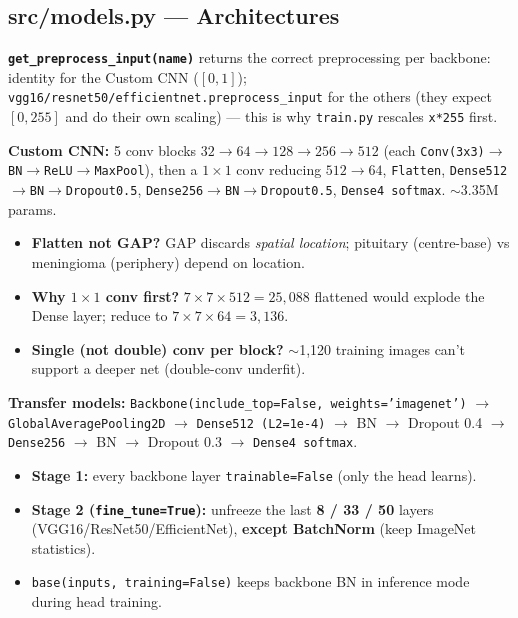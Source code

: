 \documentclass[11pt,a4paper]{article}
\newcommand{\code}[1]{\colorbox{codebg}{\small\texttt{#1}}}
\begin{document}
\subsection{src/models.py --- Architectures}
\textbf{\code{get\_preprocess\_input(name)}} returns the correct preprocessing per backbone: identity for the Custom
CNN ($[0,1]$); \code{vgg16/resnet50/efficientnet.preprocess\_input} for the others (they expect $[0,255]$ and do
their own scaling) --- this is why \code{train.py} rescales \code{x*255} first.

\begin{keybox}
\textbf{Custom CNN:} 5 conv blocks $32\to64\to128\to256\to512$ (each \code{Conv(3x3)$\to$BN$\to$ReLU$\to$MaxPool}),
then a $1\times1$ conv reducing $512\to64$, \code{Flatten}, \code{Dense512$\to$BN$\to$Dropout0.5},
\code{Dense256$\to$BN$\to$Dropout0.5}, \code{Dense4 softmax}. $\sim$3.35M params.
\begin{itemize}[leftmargin=*,itemsep=1pt]
  \item \textbf{Flatten not GAP?} GAP discards \emph{spatial location}; pituitary (centre-base) vs meningioma (periphery) depend on location.
  \item \textbf{Why $1\times1$ conv first?} $7{\times}7{\times}512=25{,}088$ flattened would explode the Dense layer; reduce to $7{\times}7{\times}64=3{,}136$.
  \item \textbf{Single (not double) conv per block?} $\sim$1{,}120 training images can't support a deeper net (double-conv underfit).
\end{itemize}
\end{keybox}

\noindent\textbf{Transfer models:} \texttt{Backbone(include\_top=False, weights='imagenet')} $\to$ \texttt{GlobalAveragePooling2D}
$\to$ \texttt{Dense512 (L2=1e-4)} $\to$ BN $\to$ Dropout 0.4 $\to$ \texttt{Dense256} $\to$ BN $\to$ Dropout 0.3 $\to$ \texttt{Dense4 softmax}.
\begin{itemize}[leftmargin=*,itemsep=1pt]
  \item \textbf{Stage 1:} every backbone layer \code{trainable=False} (only the head learns).
  \item \textbf{Stage 2 (\code{fine\_tune=True}):} unfreeze the last \textbf{8 / 33 / 50} layers (VGG16/ResNet50/EfficientNet), \textbf{except BatchNorm} (keep ImageNet statistics).
  \item \code{base(inputs, training=False)} keeps backbone BN in inference mode during head training.
\end{itemize}
\end{document}
